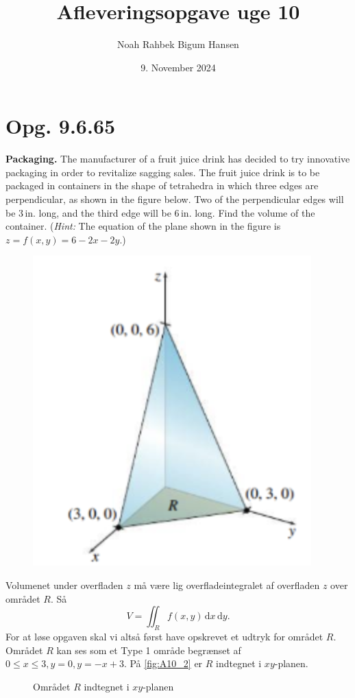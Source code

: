 \documentclass[12pt]{article}
\title{Afleveringsopgave uge 10}
\author{Noah Rahbek Bigum Hansen}
\date{9. November 2024}
\theoremstyle{definition}
\begin{document}
\maketitle

\section*{Opg. 9.6.65}
\textbf{Packaging.} The manufacturer of a fruit juice drink has decided to try innovative packaging in order to revitalize sagging sales. The fruit juice drink is to be packaged in containers in the shape of tetrahedra in which three edges are perpendicular, as shown in the figure below. Two of the perpendicular edges will be 3\,in. long, and the third edge will be 6\,in. long. Find the volume of the container. (\textit{Hint:} The equation of the plane shown in the figure is $z = f(x,y) = 6-2x-2y$.)

\begin{figure} [ht]
  \centering
  \includegraphics[width=0.4\linewidth]{../figures/A10_1.png}
  \caption{}
\end{figure}

\bigbreak
Volumenet under overfladen $z$ må være lig overfladeintegralet af overfladen $z$ over området $R$. Så
\[ 
V = \iint_R f(x,y) \, \mathrm{d}x \, \mathrm{d}y
.\]
For at løse opgaven skal vi altså først have opskrevet et udtryk for området $R$. Området $R$ kan ses som et Type 1 område begrænset af $0 \leq x \leq 3, y = 0, y = -x + 3$. På \autoref{fig:A10_2} er $R$ indtegnet i $xy$-planen.

\begin{figure}[ht]
  \centering
  \caption{Området $R$ indtegnet i $xy$-planen}
  \label{fig:A10_2}
\end{figure}
\end{document}
